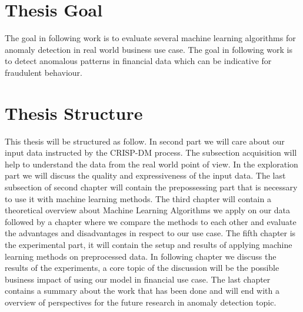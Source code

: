 \section{Thesis Goal}
The goal in following work is to evaluate several machine learning algorithms for anomaly detection in real world business use case. 
The goal in following work is to detect anomalous patterns in financial data which can be indicative for fraudulent behaviour. 

\section{Thesis Structure}

This thesis will be structured as follow. In second part we will care about our input data instructed by the CRISP-DM process. The subsection acquisition will help to understand the data from the real world point of view. In the exploration part we will discuss the quality and expressiveness of the input data. The last subsection of second chapter will contain the prepossessing part that is necessary to use it with machine learning methods. The third chapter will contain a theoretical overview about Machine Learning Algorithms we apply on our data followed by a chapter where we compare the methods to each other and evaluate the advantages and disadvantages in respect to our use case. The fifth chapter is the experimental part, it will contain the setup and results of applying machine learning methods on preprocessed data. In following chapter we discuss the results of the experiments, a core topic of the discussion will be the possible business impact of using our model in financial use case. The last chapter contains a summary about the work that has been done and will end with a overview of perspectives for the future research in anomaly detection topic.